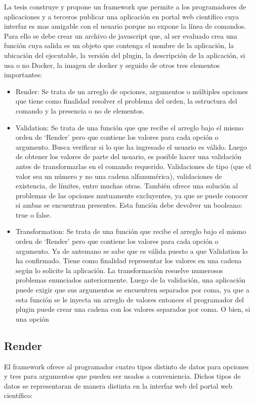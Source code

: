 La tesis construye y propone un framework que permite a los programadores de aplicaciones y a terceros publicar una aplicación en portal web científico cuya interfaz es mas amigable con el usuario porque no expone la línea de comandos. Para ello se debe crear un archivo de javascript que, al ser evaluado crea una función cuya salida es un objeto que contenga el nombre de la aplicación, la ubicación del ejecutable, la versión del plugin, la descripción de la aplicación, si usa o no Docker, la imagen de docker y seguido de otros tres elementos importantes:

\begin{itemize}
\item Render: Se trata de un arreglo de opciones, argumentos o múltiples opciones que tiene como finalidad resolver el problema del orden, la estructura del comando y la presencia o no de elementos.
\item Validation: Se trata de una función que que recibe el arreglo bajo el mismo orden de ‘Render’ pero que contiene los valores para cada opción o argumento. Busca verificar si lo que ha ingresado el usuario es válido. Luego de obtener los valores de parte del usuario, es posible hacer una validación antes de transformarlas en el comando requerido. Validaciones de tipo (que el valor sea un número y no una cadena alfanumérica), validaciones de existencia, de límites, entre muchas otras. También ofrece una solución al problemas de las opciones mutuamente excluyentes, ya que se puede conocer si ambas se encuentran presentes. Esta función debe devolver un booleano: true o false.
\item Transformation: Se trata de una función que recibe el arreglo bajo el mismo orden de ‘Render’ pero que contiene los valores para cada opción o argumento. Ya de antemano se sabe que es válida puesto a que Validation lo ha confirmado. Tiene como finalidad representar los valores en una cadena según lo solicite la aplicación. La transformación resuelve numerosos problemas enunciados anteriormente. Luego de la validación, una aplicación puede exigir que sus argumentos se encuentren separados por coma, ya que a esta función se le inyecta un arreglo de valores entonces el programador del plugin puede crear una cadena con los valores separados por coma. O bien, si una opción
\end{itemize}

\subsection{Render}
El framework ofrece al programador cuatro tipos distinto de datos para opciones y tres para argumentos que pueden ser usados a conveniencia. Dichos tipos de datos se representaran de manera distinta en la interfaz web del portal web científico:

